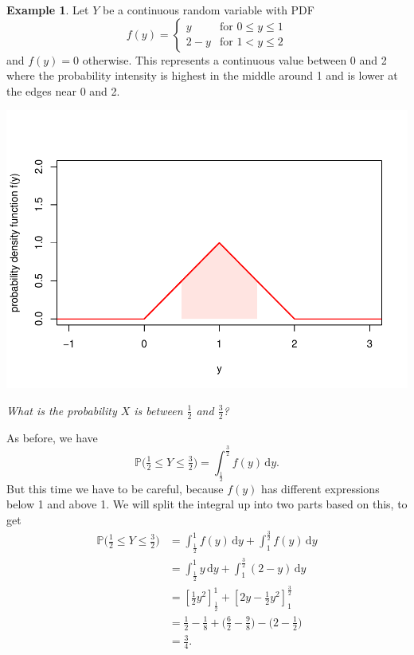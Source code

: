 \documentclass[
  a4paper,
]{book}
\theoremstyle{definition}
\theoremstyle{definition}
\newtheorem{example}{Example}[chapter]
\theoremstyle{definition}
\theoremstyle{definition}
\theoremstyle{remark}
\begin{document}
\begin{example}
\protect\hypertarget{exm:pdf2}{}\label{exm:pdf2}Let \(Y\) be a continuous random variable with PDF
\[ f(y) = \begin{cases} y & \text{for $0 \leq y \leq 1$} \\
2-y & \text{for $1 < y \leq 2$} \end{cases} \]
and \(f(y) = 0\) otherwise. This represents a continuous value between 0 and 2 where the probability intensity is highest in the middle around 1 and is lower at the edges near 0 and 2.

\includegraphics{math1710_files/figure-latex/second-pdf-1.pdf}

\emph{What is the probability \(X\) is between \(\frac12\) and \(\frac32\)?}

As before, we have
\[ \mathbb P\big( \tfrac12 \leq Y \leq \tfrac32 \big) = \int_{\frac12}^{\frac32} f(y) \, \mathrm dy .   \]
But this time we have to be careful, because \(f(y)\) has different expressions below 1 and above 1. We will split the integral up into two parts based on this, to get
\begin{align*}
\mathbb P\big( \tfrac12 \leq Y \leq \tfrac32 \big) 
  &= \int_{\frac12}^{1} f(y) \, \mathrm dy + \int_{1}^{\frac32} f(y) \, \mathrm dy \\
    &= \int_{\frac12}^{1} y \, \mathrm dy + \int_{1}^{\frac32} (2-y) \, \mathrm dy \\
    &= \left[ \tfrac12 y^2\right]_{\frac12}^1 + \left[ 2y-\tfrac12 y^2\right]_1^{\frac32} \\
    &= \tfrac12 - \tfrac18 + \big(\tfrac62 - \tfrac98\big) - \big(2 - \tfrac12\big) \\
    &= \tfrac34 .
\end{align*}
\end{example}
\end{document}
